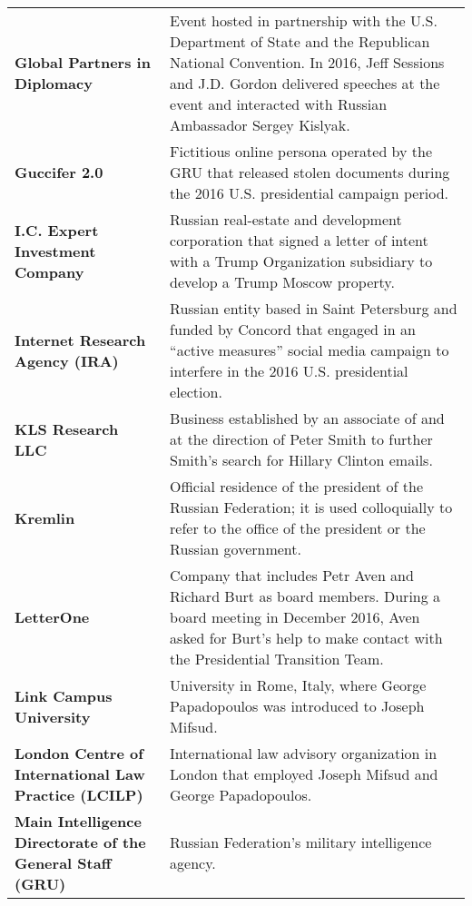 \begin{longtable}{ p{} p{} }
    \textbf{Global Partners in Diplomacy} & Event hosted in partnership with the U.S. Department of State and the Republican National Convention. In 2016, Jeff Sessions and J.D. Gordon delivered speeches at the event and interacted with Russian Ambassador Sergey Kislyak. \\

    \textbf{Guccifer 2.0} & Fictitious online persona operated by the GRU that released stolen documents during the 2016 U.S. presidential campaign period. \\

    \textbf{I.C. Expert Investment Company} & Russian real-estate and development corporation that signed a letter of intent with a Trump Organization subsidiary to develop a Trump Moscow property. \\

    \textbf{Internet Research Agency (IRA)} & Russian entity based in Saint Petersburg and funded by Concord that engaged in an “active measures” social media campaign to interfere in the 2016 U.S. presidential election. \\

    \textbf{KLS Research LLC} & Business established by an associate of and at the direction of Peter Smith to further Smith’s search for Hillary Clinton emails. \\

    \textbf{Kremlin} & Official residence of the president of the Russian Federation; it is used colloquially to refer to the office of the president or the Russian government. \\

    \textbf{LetterOne} & Company that includes Petr Aven and Richard Burt as board members. During a board meeting in December 2016, Aven asked for Burt’s help to make contact with the Presidential Transition Team. \\

    \textbf{Link Campus University} & University in Rome, Italy, where George Papadopoulos was introduced to Joseph Mifsud. \\

    \textbf{London Centre of International Law Practice (LCILP)} & International law advisory organization in London that employed Joseph Mifsud and George Papadopoulos. \\

    \textbf{Main Intelligence Directorate of the General Staff (GRU)} & Russian Federation’s military intelligence agency. \\


\end{longtable}
